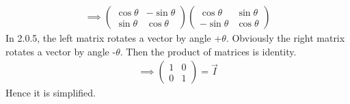 \documentclass[journal,12pt,twocolumn]{IEEEtran}
\begin{document}
\begin{gather}
    \implies\left(\begin{array}{cc}\cos\theta & -\sin\theta \\ \sin\theta & \cos\theta\end{array}\right)\left(\begin{array}{cc}\cos\theta & \sin\theta \\ -\sin\theta & \cos\theta\end{array}\right)
\end{gather}
In 2.0.5, the left matrix rotates a vector by angle +$\theta$. Obviously the right matrix rotates a vector by angle -$\theta$. Then the product of matrices is identity.
\begin{align}
    \implies\left(\begin{array}{cc} 1 & 0 \\ 0 & 1\end{array}\right)=\vec{I}
\end{align}
Hence it is simplified.
\end{document}
